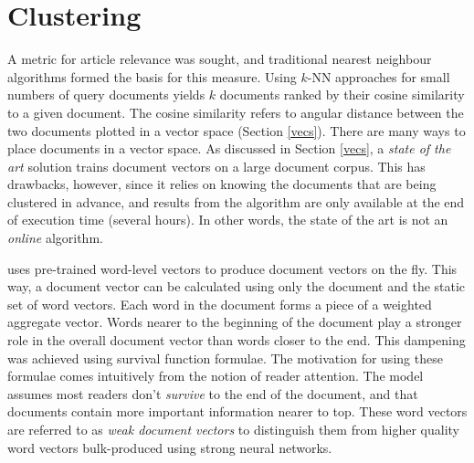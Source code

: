 \section{Clustering\label{cluster}}
A metric for article relevance was sought, and traditional nearest
neighbour algorithms formed the basis for this measure.  Using $k$-NN
approaches for small numbers of query documents yields $k$ documents
ranked by their cosine similarity to a given document.  The cosine
similarity refers to angular distance between the two documents
plotted in a vector space (Section \ref{vecs}).  There are many ways
to place documents in a vector space.  As discussed in Section
\ref{vecs}, a {\it state of the art} solution trains document vectors
on a large document corpus.  This has drawbacks, however, since
it relies on knowing the documents that are being clustered in
advance, and results from the algorithm are only available at the
end of execution time (several hours).  In
other words, the state of the art is not an {\it online}
algorithm.

\nr{} uses pre-trained word-level vectors to
produce document vectors on the fly.  This way,
a document vector can be calculated using only the document and
the static set of word vectors.
Each word in the document forms a piece of
a weighted aggregate vector.  Words nearer to the beginning of the
document play a stronger role in the overall document vector than
words closer to the end.  This dampening was achieved using
survival function formulae.  The motivation for using these formulae
comes intuitively from the notion of reader attention.  The model
assumes most readers don't {\it survive} to the end of the document,
and that documents contain more important information nearer to top.
These word vectors are referred to as {\it weak document vectors}
to distinguish them from higher quality word vectors
bulk-produced using strong neural networks.

